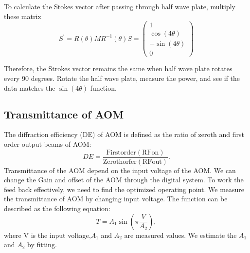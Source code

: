 To calculate the Stokes vector after passing through half wave plate, multiply these matrix
\begin{equation}
S^{'}=R(\theta)MR^{-1}(\theta)S=
\begin{pmatrix}
1\\
\cos(4\theta)\\
-\sin(4\theta)\\
0
\end{pmatrix}
\end{equation}

Therefore, the Strokes vector remains the same when half wave plate rotates every 90 degrees.
Rotate the half wave plate, measure the power, and see if the data matches the $\sin(4\theta)$ function.
\subsection{Transmittance of AOM}
The diffraction efficiency (DE) of AOM is defined as the ratio of zeroth and first order output beams of AOM:
\begin{equation}
DE=\frac{\mathrm{First order(RF on)}}{\mathrm{Zeroth orfer(RF out)}}.
\end{equation}
Transmittance of the AOM depend on the input voltage of the AOM. We can change the Gain and offset of the AOM through the digital system. To work the feed back effectively, we need to find the optimized operating point. We measure the transmittance of AOM by changing input voltage. The function can be described as the following equation:
\begin{equation}
T=A_1 \sin{\left( \pi \frac{V}{A_2}\right)},
\end{equation}
where V is the input voltage,$ A_1$ and $A_2$ are measured values. We estimate the $A_1$ and $A_2$ by fitting.

\begin{center}
\end{center}

